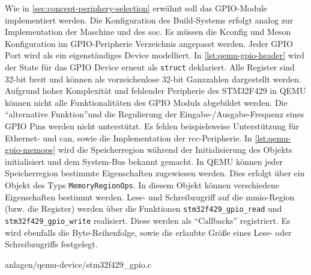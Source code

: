 Wie in \ref{sec:concept-periphery-selection} erwähnt soll das GPIO-Module
implementiert werden.
Die Konfiguration des Build-Systems erfolgt analog zur Implementation der
Maschine und des \ac{soc}.
Es müssen die Kconfig und Meson Konfiguration im GPIO-Peripherie Verzeichnis
angepasst werden.
Jeder GPIO Port wird als ein eigenständiges Device modelliert.
In \ref{lst:qemu-gpio-header} wird der State für das GPIO Device erneut als
\texttt{struct} deklariert.
Alle Register sind 32-bit breit und können als vorzeichenlose 32-bit Ganzzahlen
dargestellt werden.
\newline
Aufgrund hoher Komplexität und fehlender Peripherie des STM32F429 in QEMU
können nicht alle Funktionalitäten des GPIO Moduls abgebildet werden.
Die \enquote{alternative Funktion}\footnotemark[3] und die Regulierung der
Eingabe-/Ausgabe-Frequenz eines GPIO Pins werden nicht unterstützt.
Es fehlen beispielsweise Unterstützung für Ethernet- und \ac{can}, sowie die
Implementation der \ac{rcc}-Peripherie.
In \ref{lst:qemu-gpio-memops} wird die Speicherregion während der
Initialisierung des Objekts initialisiert und dem System-Bus bekannt gemacht.
In QEMU können jeder Speicherregion bestimmte Eigenschaften zugewiesen werden.
Dies erfolgt über ein Objekt des Typs \texttt{MemoryRegionOps}.
In diesem Objekt können verschiedene Eigenschaften bestimmt werden.
Lese- und Schreibzugriff auf die \ac{mmio}-Region (bzw. die Register) werden
über die Funktionen \texttt{stm32f429\_gpio\_read} und
\texttt{stm32f429\_gpio\_write} realisiert.
Diese werden als \enquote{Callbacks} registriert.
Es wird ebenfalls die Byte-Reihenfolge, sowie die erlaubte Größe eines Lese-
oder Schreibzugriffs festgelegt.

\begin{minipage}{\linewidth}

                {anlagen/qemu-device/stm32f429_gpio.c}
\end{minipage}

